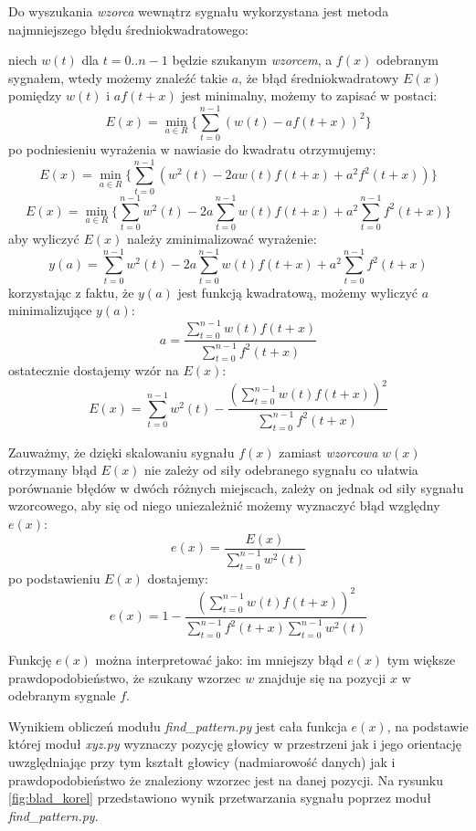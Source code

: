 Do wyszukania \textit{wzorca} wewnątrz sygnału wykorzystana jest metoda najmniejszego błędu średniokwadratowego:

niech $w(t)$  dla $t = 0..n-1$ będzie szukanym \textit{wzorcem}, a $f(x)$ odebranym sygnałem,
wtedy możemy znaleźć takie $a$, że błąd średniokwadratowy $E(x)$ pomiędzy $w(t)$ i $a f(t+x)$ jest minimalny,
możemy to zapisać w postaci:
\[
  E(x) = \min_{a \in R} \{ \sum_{t=0}^{n-1}  (w(t) - a f(t+x))^2 \}
\]
po podniesieniu wyrażenia w nawiasie do kwadratu otrzymujemy:
\[
  E(x) = \min_{a \in R} \{ \sum_{t=0}^{n-1}  (w^2(t) -2a w(t) f(t+x) + a^2 f^2(t+x)) \}
\]
\[
  E(x) = \min_{a \in R} \{ \sum_{t=0}^{n-1}  w^2(t) -2a \sum_{t=0}^{n-1}  w(t) f(t+x) + a^2 \sum_{t=0}^{n-1} f^2(t+x) \}
\]
aby wyliczyć $E(x)$ należy zminimalizować wyrażenie:
\[
  y(a) = \sum_{t=0}^{n-1}  w^2(t) -2a \sum_{t=0}^{n-1}  w(t) f(t+x) + a^2 \sum_{t=0}^{n-1} f^2(t+x)
\]
 korzystając z faktu, że $y(a)$ jest funkcją kwadratową, możemy wyliczyć $a$ minimalizujące $y(a)$:
\[
 a = \frac{ \sum\limits_{t=0}^{n-1}  w(t) f(t+x) }{ \sum\limits_{t=0}^{n-1} f^2(t+x) }
\]
ostatecznie dostajemy wzór na $E(x)$:
\[
  E(x) = \sum_{t=0}^{n-1}  w^2(t)  - \frac {(\sum\limits_{t=0}^{n-1}  w(t) f(t+x) )^2 } { \sum\limits_{t=0}^{n-1} f^2(t+x)}
\]

Zauważmy, że dzięki skalowaniu sygnału $f(x)$ zamiast \textit{wzorcowa} $w(x)$
otrzymany błąd $E(x)$ nie zależy od siły odebranego sygnału co ułatwia porównanie błędów w dwóch różnych miejscach,
zależy on jednak od siły sygnału wzorcowego, aby się od niego uniezależnić możemy wyznaczyć
błąd względny $e(x)$:
\[
  e(x) = \frac{E(x)}{\sum\limits_{t=0}^{n-1}  w^2(t)}
\]
po podstawieniu $E(x)$ dostajemy:
\[
  e(x) = 1 - \frac {(\sum\limits_{t=0}^{n-1}  w(t) f(t+x) )^2 } { \sum\limits_{t=0}^{n-1} f^2(t+x) \sum\limits_{t=0}^{n-1}  w^2(t)}
\]
 
 Funkcję $e(x)$  można interpretować jako:
 im mniejszy błąd $e(x)$ tym większe prawdopodobieństwo, że szukany wzorzec $w$ znajduje się na pozycji $x$ w 
 odebranym sygnale $f$. 

 Wynikiem obliczeń modułu \textit{find\_pattern.py} jest cała funkcja $e(x)$, na podstawie której moduł \textit{xyz.py}
 wyznaczy pozycję głowicy w przestrzeni jak i jego orientację uwzględniając przy tym 
 kształt głowicy (nadmiarowość danych) jak i prawdopodobieństwo że znaleziony wzorzec jest na danej pozycji.
 Na rysunku \ref{fig:blad_korel} przedstawiono wynik przetwarzania sygnału poprzez moduł \textit{find\_pattern.py}.

